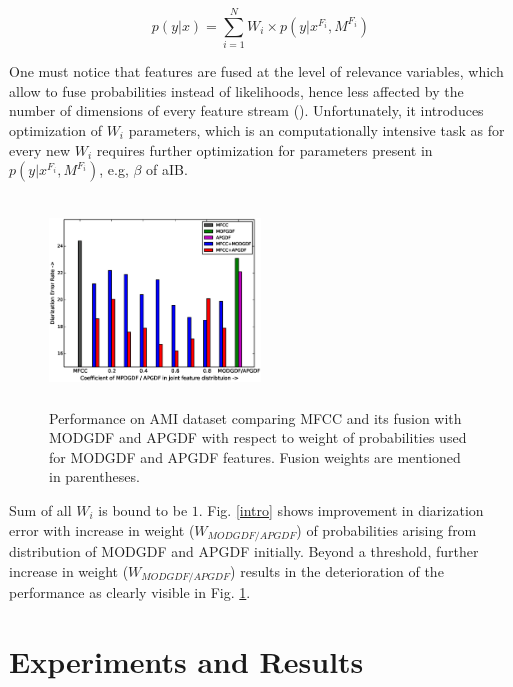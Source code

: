 \documentclass[conference]{IEEEtran}
\begin{document}
\begin{equation}
p(y|x) = \sum _{i=1}^{N} W_i \times p(y|x^{F_{i}},M^{F_{i}})
\label{eq:feat_combs}
\end{equation}

One must notice that features are fused at the level of relevance variables, which allow to fuse probabilities instead of likelihoods, hence less affected by the number of dimensions of every feature stream (\cite{aIB}). Unfortunately, it introduces optimization of $W_i$ parameters, which is an computationally intensive task as for every new $W_i$ requires further optimization for parameters present in $p(y|x^{F_{i}},M^{F_{i}})$, e.g, $\beta$ of aIB.

\begin{figure}[h]
\centering
\includegraphics[width=0.5\textwidth,height=5.5cm]{figures/newFusionResults.eps}
\caption{Performance on AMI dataset comparing MFCC and its fusion with MODGDF and APGDF with respect to weight of probabilities used for MODGDF and APGDF features. Fusion weights are mentioned in parentheses.}
\label{fig:fusionResults}
\end{figure}
Sum of all $W_i$ is bound to be $1$. Fig. \ref{intro} shows improvement in diarization error with increase in weight ($W_{MODGDF/APGDF}$) of probabilities arising from distribution of MODGDF and APGDF initially. Beyond a threshold, further increase in weight ($W_{MODGDF/APGDF}$) results in the deterioration of the performance as clearly visible in Fig. \ref{fig:fusionResults}.   

\section{Experiments and Results}
\label{experimentsNresults}
\end{document}
